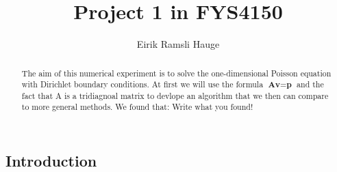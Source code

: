 \documentclass[12pt,a4paper]{article}
\author{Eirik Ramsli Hauge}
\title{Project 1 in FYS4150}
\newcommand{\V}[1]{\textbf{#1}}
\newcommand{\husk}[1]{\color{red} #1 \color{black}}
\begin{document}
	\maketitle
	
\begin{abstract}
The aim of this numerical experiment is to solve the one-dimensional Poisson equation with Dirichlet boundary conditions. At first we will use the formula $\V{A} \V{v} = \V{p}$ and the fact that A is a tridiagnoal matrix to devlope an algorithm that we then can compare to more general methods. We found that: \husk{Write what you found!}
\end{abstract}
\subsection*{Introduction}
\end{document}
